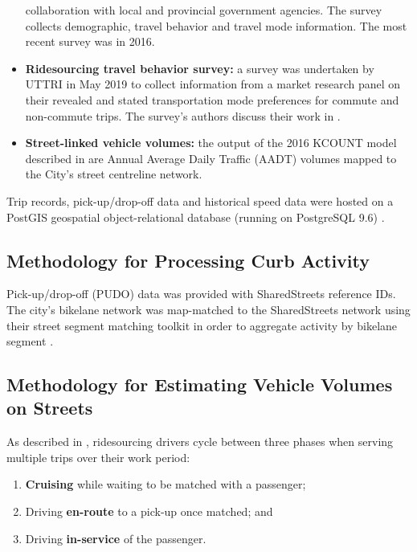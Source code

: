 \documentclass[]{trbunofficial_bdit_final}
\begin{document}
\begin{itemize}
  collaboration with local and provincial government agencies. The survey
  collects demographic, travel behavior and travel mode information. The
  most recent survey was in 2016.
\item
  \textbf{Ridesourcing travel behavior survey:} a survey was undertaken by UTTRI
  in May 2019 to collect information from a market research panel on their
  revealed and stated transportation mode preferences for commute and
  non-commute trips. The survey's authors discuss their work in
  .
\item
  \textbf{Street-linked vehicle volumes:} the output of the 2016 KCOUNT model
  described in  are Annual Average Daily Traffic (AADT)
  volumes mapped to the City's street centreline network.
\end{itemize}

Trip records, pick-up/drop-off data and historical speed data were hosted on
a PostGIS geospatial object-relational database (running on PostgreSQL 9.6)
\citep{postgres, postgis}.

\hypertarget{methodology-for-processing-curb-activity}{%
\subsection{Methodology for Processing Curb Activity}\label{methodology-for-processing-curb-activity}}

Pick-up/drop-off (PUDO) data was provided with SharedStreets reference IDs. The
city's bikelane network was map-matched to the SharedStreets network using
their street segment matching toolkit in order to aggregate activity by
bikelane segment \cite{sharedstreetshowtomatch}.

\hypertarget{sec:volumesonstreets}{%
\subsection{Methodology for Estimating Vehicle Volumes on Streets}\label{sec:volumesonstreets}}

As described in , ridesourcing drivers cycle between
three phases when serving multiple trips over their work period:

\begin{enumerate}
\def\labelenumi{\arabic{enumi}.}
\item
  \textbf{Cruising} while waiting to be matched with a passenger;
\item
  Driving \textbf{en-route} to a pick-up once matched; and
\item
  Driving \textbf{in-service} of the passenger.
\end{enumerate}
\end{document}
